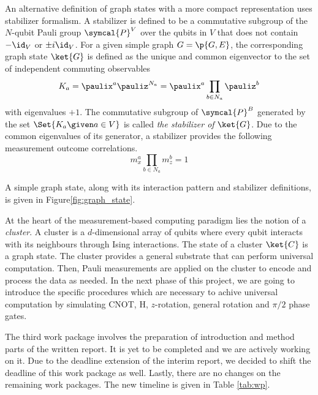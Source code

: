 An alternative definition of graph states with a more compact representation uses stabilizer formalism\cite{caves2014}. A stabilizer is defined to be a commutative subgroup of the \(N\)-qubit Pauli group \(\symcal{P}^V\) over the qubits in \(V\) that does not contain \(-\id_V\) or \(\pm i\id_V\)\cite{Briegel_2001,pusey2011}. For a given simple graph \(G=\p{G, E}\), the corresponding graph state \(\ket{G}\) is defined as the unique and common eigenvector to the 
set of independent commuting observables
\begin{equation}
  K_a = \paulix^a \pauliz^{N_a} = \paulix^a \prod_{b\in N_a} \pauliz^{b}
\end{equation}
with eigenvalues \(+1\). The commutative subgroup of \(\symcal{P}^B\) generated by the set \(\Set{K_a \given a \in V}\) is called \emph{the stabilizer of}\/ \(\ket{G}\). Due to the common eigenvalues of its generator, a stabilizer provides the following measurement outcome correlations.
\begin{equation}
  m_x^a\prod_{b\in N_a}m_z^b = 1
\end{equation}

A simple graph state, along with its interaction pattern and stabilizer definitions, is given in Figure\ref{fig:graph_state}.


At the heart of the measurement-based computing paradigm lies the notion of a \emph{cluster}\cite{russendorf2001,russendorf2003}. A cluster is a \(d\)-dimensional array of qubits where every qubit interacts with its neighbours through Ising interactions. The state of a cluster \(\ket{C}\) is a graph state. The cluster provides a general substrate that can perform universal computation. Then, Pauli measurements are applied on the cluster to encode and process the data as needed. In the next phase of this project, we are going to introduce the specific procedures which are necessary to achive universal computation by simulating CNOT, H, \(z\)-rotation, general rotation and \(\pi/2\) phase gates.

The third work package involves the preparation of introduction and method parts of the written report. It is yet to be completed and we are actively working on it. Due to the deadline extension of the interim report, we decided to shift the deadline of this work package as well. Lastly, there are no changes on the remaining work packages. The new timeline is given in Table \ref{tab:wp}.

